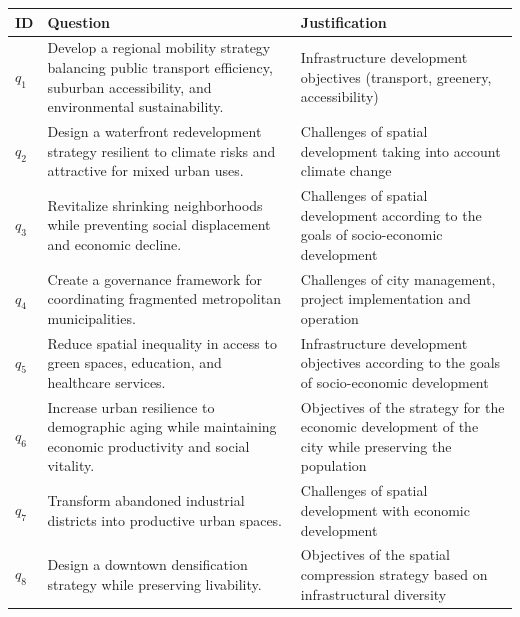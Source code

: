 \begin{table}[h]
\centering
\small
\begin{tabularx}{\textwidth}{l | X X}
\hline
\textbf{ID} & \textbf{Question} & \textbf{Justification} \\
\hline
$q_1$ & Develop a regional mobility strategy balancing public transport efficiency, suburban accessibility, and environmental sustainability. & Infrastructure development objectives (transport, greenery, accessibility) \\

\midrule

$q_2$ & Design a waterfront redevelopment strategy resilient to climate risks and attractive for mixed urban uses. & Challenges of spatial development taking into account climate change \\

\midrule

$q_3$ & Revitalize shrinking neighborhoods while preventing social displacement and economic decline. & Challenges of spatial development according to the goals of socio-economic development \\

\midrule

$q_4$ & Create a governance framework for coordinating fragmented metropolitan municipalities. & Challenges of city management, project implementation and operation \\

\midrule

$q_5$ & Reduce spatial inequality in access to green spaces, education, and healthcare services. & Infrastructure development objectives according to the goals of socio-economic development \\

\midrule

$q_6$ & Increase urban resilience to demographic aging while maintaining economic productivity and social vitality. & Objectives of the strategy for the economic development of the city while preserving the population \\

\midrule

$q_7$ & Transform abandoned industrial districts into productive urban spaces. & Challenges of spatial development with economic development \\

\midrule

$q_8$ & Design a downtown densification strategy while preserving livability. & Objectives of the spatial compression strategy based on infrastructural diversity \\


\end{tabularx}
\end{table}
